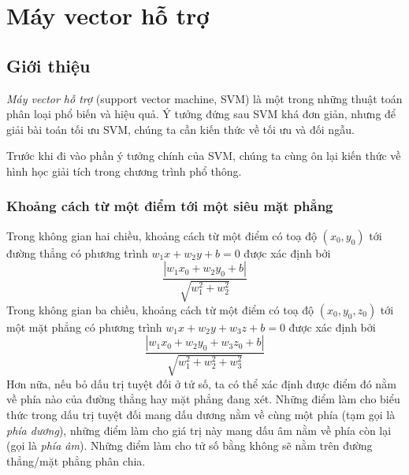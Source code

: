 \chapter{Máy vector hỗ trợ}
\label{cha:svm}



\section{Giới thiệu}
\textit{Máy vector hỗ trợ} (support vector machine, SVM) là một trong những
thuật toán phân loại phổ biến và hiệu quả. Ý tưởng đứng sau SVM khá đơn giản,
nhưng để giải bài toán tối ưu SVM, chúng ta cần kiến thức về tối ưu và đối ngẫu.

Trước khi đi vào phần ý tưởng chính của SVM, chúng ta cùng ôn lại kiến thức về hình học giải tích trong chương trình phổ thông.


\subsection{Khoảng cách từ một điểm tới một siêu mặt phẳng}
Trong không gian hai chiều, khoảng cách từ một điểm có toạ độ $(x_0, y_0)$ tới
{đường thẳng} có phương trình $w_1x + w_2y + b = 0$ được xác định bởi
\begin{equation*}
\frac{|w_1x_0 + w_2y_0 + b|}{\sqrt{w_1^2 + w_2^2}}
\end{equation*}
Trong không gian ba chiều, khoảng cách từ một điểm có toạ độ $(x_0, y_0, z_0)$ tới một {mặt phẳng} có phương trình $w_1x + w_2y + w_3 z + b = 0$ được xác định bởi
\begin{equation*}
\frac{|w_1x_0 + w_2y_0 + w_3z_0 + b|}{\sqrt{w_1^2 + w_2^2 + w_3^2}}
\end{equation*}
Hơn nữa, nếu bỏ dấu trị tuyệt đối ở tử số, ta có thể xác định được điểm
đó nằm về phía nào của {đường thẳng} hay {mặt phẳng} đang xét.
Những điểm làm cho biểu thức trong dấu trị tuyệt đối mang dấu dương nằm về
cùng một phía (tạm gọi là \textit{phía dương}), những điểm làm
cho giá trị này mang dấu âm nằm về phía còn lại (gọi là \textit{phía âm}). Những điểm làm cho tử số bằng không sẽ nằm trên đường thẳng/mặt phẳng phân chia.

